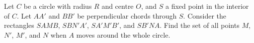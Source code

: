 Let $C$ be a circle with radius $R$ and centre $O$, and $S$ a fixed point in the interior of $C$. Let $AA'$ and $BB'$ be perpendicular chords through $S$. Consider the rectangles $SAMB$, $SBN'A'$, $SA'M'B'$, and $SB'NA$. Find the set of all points $M$, $N'$, $M'$, and $N$ when $A$ moves around the whole circle.